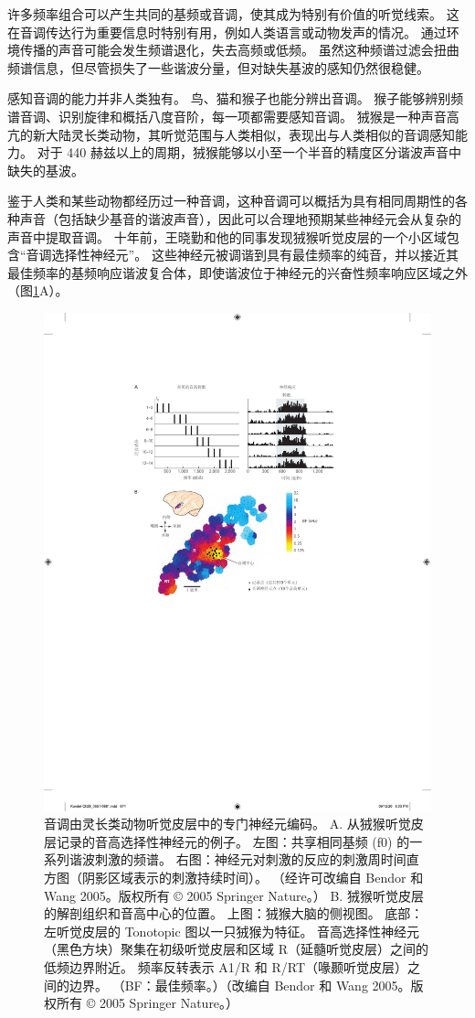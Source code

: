 许多频率组合可以产生共同的基频或音调，使其成为特别有价值的听觉线索。 
这在音调传达行为重要信息时特别有用，例如人类语言或动物发声的情况。 
通过环境传播的声音可能会发生频谱退化，失去高频或低频。 
虽然这种频谱过滤会扭曲频谱信息，但尽管损失了一些谐波分量，但对缺失基波的感知仍然很稳健。


感知音调的能力并非人类独有。 
鸟、猫和猴子也能分辨出音调。 
猴子能够辨别频谱音调、识别旋律和概括八度音阶，每一项都需要感知音调。 
狨猴是一种声音高亢的新大陆灵长类动物，其听觉范围与人类相似，表现出与人类相似的音调感知能力。 
对于 440 赫兹以上的周期，狨猴能够以小至一个半音的精度区分谐波声音中缺失的基波。


鉴于人类和某些动物都经历过一种音调，这种音调可以概括为具有相同周期性的各种声音（包括缺少基音的谐波声音），因此可以合理地预期某些神经元会从复杂的声音中提取音调。 
十年前，王晓勤和他的同事发现狨猴听觉皮层的一个小区域包含“音调选择性神经元”。 
这些神经元被调谐到具有最佳频率的纯音，并以接近其最佳频率的基频响应谐波复合体，即使谐波位于神经元的兴奋性频率响应区域之外（图\ref{fig:28_13}A）。

\begin{figure}[htbp]
	\centering
	\includegraphics[width=0.5\linewidth]{chap28/fig_28_13}
	\caption{音调由灵长类动物听觉皮层中的专门神经元编码。 
		A. 从狨猴听觉皮层记录的音高选择性神经元的例子。 左图：共享相同基频 (f0) 的一系列谐波刺激的频谱。 右图：神经元对刺激的反应的刺激周时间直方图（阴影区域表示的刺激持续时间）。 
		（经许可改编自 Bendor 和 Wang 2005。版权所有 © 2005 Springer Nature。） 
		B. 狨猴听觉皮层的解剖组织和音高中心的位置。 上图：狨猴大脑的侧视图。 
		底部：左听觉皮层的 Tonotopic 图以一只狨猴为特征。 
		音高选择性神经元（黑色方块）聚集在初级听觉皮层和区域 R（延髓听觉皮层）之间的低频边界附近。 
		频率反转表示 A1/R 和 R/RT（喙颞听觉皮层）之间的边界。 
		（BF：最佳频率。）（改编自 Bendor 和 Wang 2005。版权所有 © 2005 Springer Nature。）}
	\label{fig:28_13}
\end{figure}

